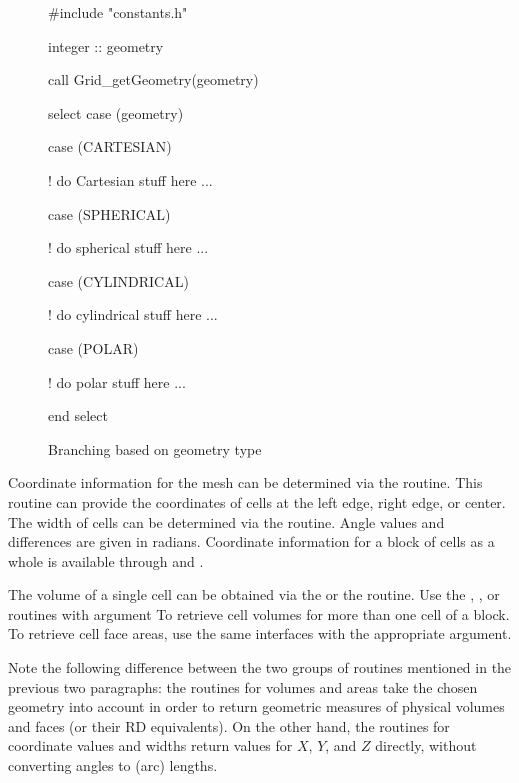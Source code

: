 \begin{figure}[ht]
\begin{shrink}
\begin{fcodeseg}
  #include "constants.h"

  integer :: geometry

  call Grid_getGeometry(geometry)

  select case (geometry)

  case (CARTESIAN)

  ! do Cartesian stuff here ...

  case (SPHERICAL)

  ! do spherical stuff here ...

  case (CYLINDRICAL)

  ! do cylindrical stuff here ...

  case (POLAR)

  ! do polar stuff here ...

  end select
\end{fcodeseg}
\end{shrink}
\caption{\label{Code:geom_select} Branching based on geometry type}
\end{figure}

Coordinate information for the mesh can be determined via the
 routine.
This routine can provide the coordinates of cells at the left
edge, right edge, or center.
The width of cells can be determined via the
 routine.
Angle values and differences are given in radians.
Coordinate information for a block of cells as a whole
is available through
and
.


The volume of a single cell can be obtained via the
 or the
routine.
Use the
,
, or
routines with argument 
To retrieve cell volumes for more than one cell of a block.
To retrieve cell face areas, use the same 
interfaces with the appropriate  argument.

Note the following difference between the two groups of routines mentioned in
the previous two paragraphs: the routines for volumes and areas take
the chosen geometry into account in order to return geometric measures
of physical volumes and faces (or their RD equivalents).
On the other hand, the routines for coordinate values and widths
return values for $X$, $Y$, and $Z$ directly, without converting
angles to (arc) lengths.



